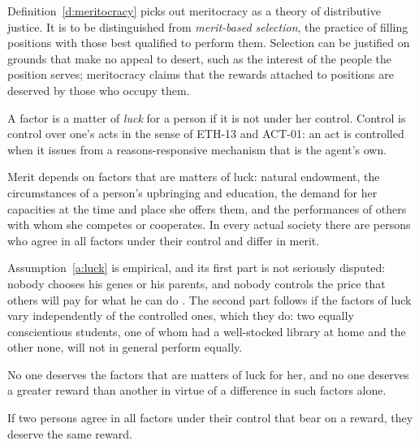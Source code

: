 \documentclass{situationist-preprint}
\begin{document}
Definition~\ref{d:meritocracy} picks out meritocracy as a theory of distributive justice. It is to be distinguished from \emph{merit-based selection}, the practice of filling positions with those best qualified to perform them. Selection can be justified on grounds that make no appeal to desert, such as the interest of the people the position serves; meritocracy claims that the rewards attached to positions are deserved by those who occupy them.

\begin{definition}\label{d:luck}
A factor is a matter of \emph{luck} for a person if it is not under her control. Control is control over one's acts in the sense of ETH-13 and ACT-01: an act is controlled when it issues from a reasons-responsive mechanism that is the agent's own.
\end{definition}

\begin{assumption}\label{a:luck}
Merit depends on factors that are matters of luck: natural endowment, the circumstances of a person's upbringing and education, the demand for her capacities at the time and place she offers them, and the performances of others with whom she competes or cooperates. In every actual society there are persons who agree in all factors under their control and differ in merit.
\end{assumption}

Assumption~\ref{a:luck} is empirical, and its first part is not seriously disputed: nobody chooses his genes or his parents, and nobody controls the price that others will pay for what he can do \citep{Frank2016}. The second part follows if the factors of luck vary independently of the controlled ones, which they do: two equally conscientious students, one of whom had a well-stocked library at home and the other none, will not in general perform equally.

\begin{principle}\label{p:notdeserved}
No one deserves the factors that are matters of luck for her, and no one deserves a greater reward than another in virtue of a difference in such factors alone.
\end{principle}

\begin{principle}[Parity]\label{p:parity}
If two persons agree in all factors under their control that bear on a reward, they deserve the same reward.
\end{principle}
\end{document}

